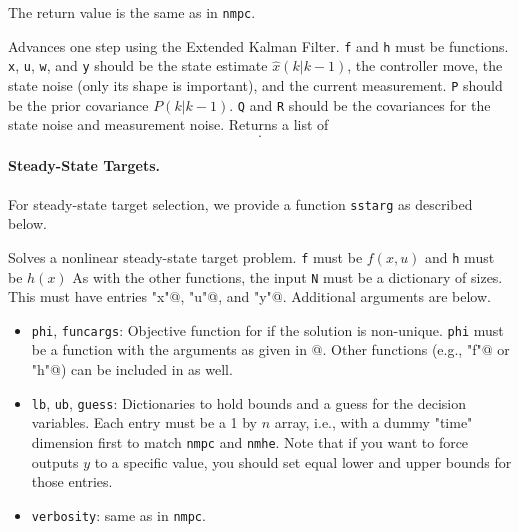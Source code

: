 \documentclass{article}
\begin{document}
\begin{multicols}{2}
The return value is the same as in \texttt{nmpc}.


Advances one step using the Extended Kalman Filter.
\texttt{f} and \texttt{h} must be \casadi{} functions.
\texttt{x}, \texttt{u}, \texttt{w}, and \texttt{y} should be the state estimate $\hat{x}(k|k-1)$, the controller move, the state noise (only its shape is important), and the current measurement.
\texttt{P} should be the prior covariance $P(k|k-1)$.
\texttt{Q} and \texttt{R} should be the covariances for the state noise and measurement noise.
Returns a list of
%
\begin{equation*}
    [P(k+1|k), \; \hat{x}(k+1|k), \; P(k|k), \; \hat{x}(k|k)].
\end{equation*}

\paragraph*{Steady-State Targets.}

For steady-state target selection, we provide a function \texttt{sstarg} as described below.


Solves a nonlinear steady-state target problem.
\texttt{f} must be $f(x,u)$ and \texttt{h} must be $h(x)$
As with the other functions, the input \texttt{N} must be a dictionary of sizes.
This must have entries \lstinline@"x"@, \lstinline@"u"@, and \lstinline@"y"@.
Additional arguments are below.

\begin{itemize}[noitemsep,nolistsep]
    \item \texttt{phi}, \texttt{funcargs}: Objective function for if the solution is non-unique.
    \texttt{phi} must be a \casadi{} function with the arguments as given in \lstinline@funcargs["phi"]@.
    Other functions (e.g., \lstinline@"f"@ or \lstinline@"h"@) can be included in \lstinline@funcargs@ as well.
    \item \texttt{lb}, \texttt{ub}, \texttt{guess}: Dictionaries to hold bounds and a guess for the decision variables.
    Each entry must be a 1 by $n$ array, i.e., with a dummy "time" dimension first to match \texttt{nmpc} and \texttt{nmhe}.
    Note that if you want to force outputs $y$ to a specific value, you should set equal lower and upper bounds for those entries.
    \item \texttt{verbosity}: same as in \texttt{nmpc}.
\end{itemize}


\end{multicols}
\end{document}
